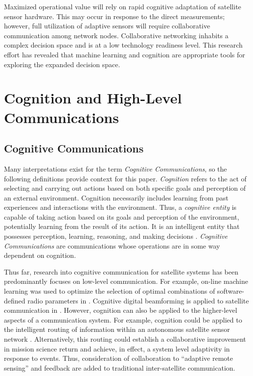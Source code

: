 \documentclass[conference]{IEEEtran}
\begin{document}
Maximized operational value will rely on rapid cognitive adaptation of satellite sensor hardware.  This may occur in response to the direct measurements; however, full utilization of adaptive sensors will require collaborative communication among network nodes.  Collaborative networking inhabits a complex decision space and is at a low technology readiness level.  This research effort has revealed that machine learning and cognition are appropriate tools for exploring the expanded decision space.


\section{Cognition and High-Level Communications} \label{sec:hlc}

\subsection{Cognitive Communications}
\label{ssec:cognit}


Many interpretations exist for the term \textit{Cognitive Communications}, so the following definitions provide context for this paper.  \textit{Cognition} refers to the act of selecting and carrying out actions based on both specific {\color{black} goals and perception of an external environment}.  Cognition necessarily includes learning from past experiences and {\color{black} interactions with the environment}.  Thus, a \textit{cognitive entity} is capable of taking action based on its {\color{black} goals and perception of the environment}, potentially learning from the result of its action.  It is an intelligent entity that possesses perception, learning, reasoning, and making decisions \cite{ref7}. \textit{Cognitive Communications} are communications whose operations are in some way dependent on cognition.

Thus far, research into cognitive communication for satellite systems has been predominantly focuses on low-level communication.  For example, on-line machine learning was used to optimize the selection of optimal combinations of software-defined radio parameters in \cite{ref4}.  Cognitive digital beamforming is applied to satellite communication in \cite{ref5}.  However, cognition can also be applied to the higher-level aspects of a communication system.  For example, cognition could be applied to the intelligent routing of information within an autonomous satellite sensor network \cite{ref7}.  Alternatively, this routing could establish a collaborative improvement in mission science return and achieve, in effect, a system level adaptivity in response to events.  Thus, consideration of collaboration to ``adaptive remote sensing'' and feedback are added to traditional inter-satellite communication.
\end{document}
